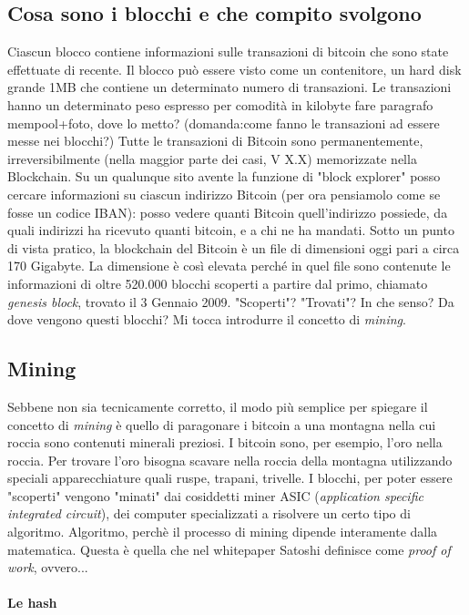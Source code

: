 \documentclass {article}
\begin{document}
\subsection {Cosa sono i blocchi e che compito svolgono}

Ciascun blocco contiene informazioni sulle transazioni di bitcoin che sono state effettuate di recente.
Il blocco può essere visto come un contenitore, un hard disk grande 1MB che contiene un determinato numero di transazioni.
Le transazioni hanno un determinato peso espresso per comodità in kilobyte fare paragrafo mempool+foto, dove lo metto? (domanda:come fanno le transazioni ad essere messe nei blocchi?)
Tutte le transazioni di Bitcoin sono permanentemente, irreversibilmente (nella maggior parte dei casi, V X.X) memorizzate nella Blockchain.
Su un qualunque sito avente la funzione di "block explorer" posso cercare informazioni su ciascun indirizzo Bitcoin (per ora pensiamolo come se fosse un codice IBAN): posso vedere quanti Bitcoin quell'indirizzo possiede, da quali indirizzi ha ricevuto quanti bitcoin, e a chi ne ha mandati.
Sotto un punto di vista pratico, la blockchain del Bitcoin è un file di dimensioni oggi pari a circa 170 Gigabyte.
La dimensione è così elevata perché in quel file sono contenute le informazioni di oltre 520.000 blocchi scoperti a partire dal primo, chiamato \textit{genesis block}, trovato il 3 Gennaio 2009.
"Scoperti"? "Trovati"? In che senso? Da dove vengono questi blocchi? Mi tocca introdurre il concetto di \textit{mining}.


\subsection {Mining}


Sebbene non sia tecnicamente corretto, il modo più semplice per spiegare il concetto di \textit{mining} è quello di paragonare i bitcoin a una montagna nella cui roccia sono contenuti minerali preziosi.
I bitcoin sono, per esempio, l'oro nella roccia.
Per trovare l'oro bisogna scavare nella roccia della montagna utilizzando speciali apparecchiature quali ruspe, trapani, trivelle.
I blocchi, per poter essere "scoperti" vengono "minati" dai cosiddetti miner ASIC (\textit{application specific integrated circuit}), dei computer specializzati a risolvere un certo tipo di algoritmo.
Algoritmo, perchè il processo di mining dipende interamente dalla matematica.
Questa è quella che nel whitepaper Satoshi definisce come \textit{proof of work}, ovvero...

\paragraph {Le hash}
\end{document}
